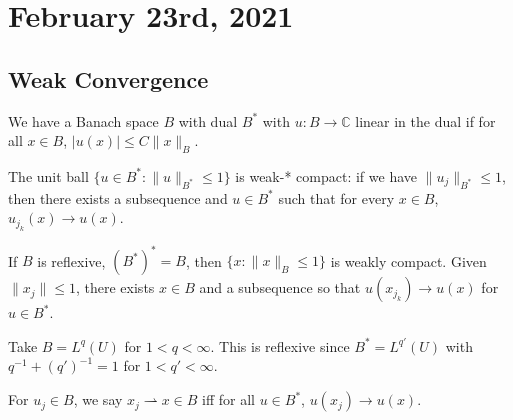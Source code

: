 \documentclass[12pt]{scrartcl}
\newcommand{\C}{\mathbb C}
\newcommand{\<}{\langle}
\renewcommand{\>}{\rangle}
\begin{document}
\pagebreak
\section{February 23rd, 2021}
\subsection{Weak Convergence}
We have a Banach space $B$ with dual $B^*$ with $u : B \to \C$ linear in the dual if for all $x \in B$, $|u(x)| \le C\|x\|_B$.

\begin{thm} The unit ball $\{u \in B^*: \|u\|_{B^*} \le 1\}$ is weak-* compact: if we have $\|u_j\|_{B^*} \le 1$, then there exists a subsequence and $u \in B^*$ such that for every $x \in B$, $u_{j_k}(x) \to u(x)$.
\end{thm}
\begin{corollary} If $B$ is reflexive, $(B^*)^* = B$, then $\{x: \|x\|_B \le 1\}$ is weakly compact.  Given $\|x_j\| \le 1$, there exists $x \in B$ and a subsequence so that $u(x_{j_k}) \to u(x)$ for $u \in B^*$.
\end{corollary}
\begin{example} Take $B = L^q(U)$ for $1 < q < \infty$.  This is reflexive since $B^* = L^{q'}(U)$ with $q^{-1} + (q')^{-1} = 1$ for $1 < q' < \infty$.
\end{example}
\begin{remark} For $u_j \in B$, we say $x_j \rightharpoonup x \in B$ iff for all $u \in B^*$, $u(x_j) \to u(x)$.
\end{remark}
\end{document}

